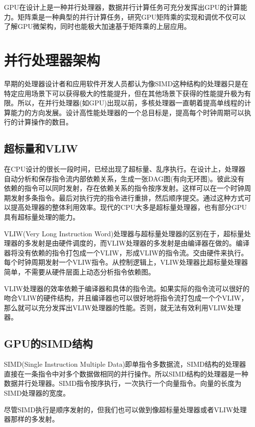 GPU在设计上是一种并行处理器，数据并行计算任务可充分发挥出GPU的计算能力。矩阵乘是一种典型的并行计算任务，研究GPU矩阵乘的实现和调优不仅可以了解GPU微架构，同时也能极大加速基于矩阵乘的上层应用。



\section{并行处理器架构}
早期的处理器设计者和应用软件开发人员都认为像SIMD这种结构的处理器只是在特定应用场景下可以获得极大的性能提升，但在其他场景下获得的性能提升极为有限。所以，在并行处理器(如GPU)出现以前，多核处理器一直朝着提高单线程的计算能力的方向发展。设计高性能处理器的一个总目标是，提高每个时钟周期可以执行的计算操作的数目。

\subsection{超标量和VLIW}
在CPU设计的很长一段时间，已经出现了超标量、乱序执行。在设计上，处理器自动分析和保存指令流内部依赖关系，生成一张DAG图(有向无环图)。彼此没有依赖的指令可以同时发射，存在依赖关系的指令按序发射。这样可以在一个时钟周期发射多条指令。最后对执行完的指令进行重排，然后顺序提交。通过这种方式可以提高处理器的整体利用效率。现代的CPU大多是超标量处理器，也有部分GPU具有超标量处理的能力。

VLIW(Very Long Instruction Word)处理器与超标量处理器的区别在于，超标量处理器的多发射是由硬件调度的，而VLIW处理器的多发射是由编译器在做的。编译器将没有依赖的指令打包成一个VLIW，形成VLIW的指令流。交由硬件来执行。每个时钟周期发射一个VLIW指令。从控制逻辑上，VLIW处理器比超标量处理器简单，不需要从硬件层面上动态分析指令依赖图。

VLIW处理器的效率依赖于编译器和具体的指令流。如果实际的指令流可以很好的吻合VLIW的硬件结构，并且编译器也可以很好地将指令流打包成一个个VLIW，那么就可以充分发挥出VLIW处理器的性能。否则，就无法有效利用VLIW处理器。


\subsection{GPU的SIMD结构}
SIMD(Single Instruction Multiple Data)即单指令多数据流，SIMD结构的处理器直接在一条指令中对多个数据做相同的并行操作。所以SIMD结构的处理器是一种数据并行处理器。SIMD指令按序执行，一次执行一个向量指令。向量的长度为SIMD处理器的宽度。

尽管SIMD执行是顺序发射的，但我们也可以做到像超标量处理器或者VLIW处理器那样的多发射。

